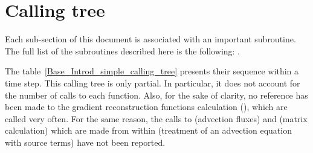 
%
%
%
%


\section*{Calling tree}

%
Each sub-section of this document is associated with an important
subroutine. The full list of the subroutines described here is the
following:     %
   .

The table~\ref{Base_Introd_simple_calling_tree} presents their sequence within a time
step. This calling tree is only partial. In particular, it does not account
for the number of calls to each function. Also, for the sake of clarity,
no reference has been made to the gradient reconstruction functions
calculation (), which are called very often. For
the same reason, the calls to  (advection fluxes) and %
 (matrix calculation) which are made from
within 
(treatment of an advection equation with source terms) have not been
reported.

